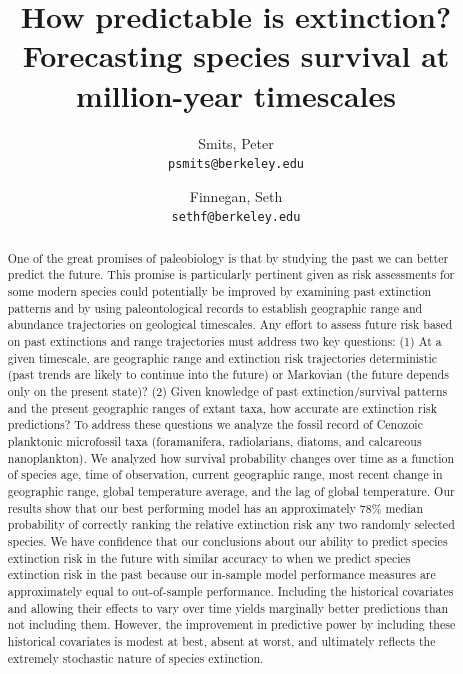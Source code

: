 \documentclass[12pt,letterpaper]{article}
\title{How predictable is extinction? Forecasting species survival at million-year timescales}
\author{
  Smits, Peter\\
  \texttt{psmits@berkeley.edu} 
  \and
  Finnegan, Seth\\
  \texttt{sethf@berkeley.edu}
}
\begin{document}
\maketitle

\linenumbers{}
\modulolinenumbers[3]

\begin{abstract}
  One of the great promises of paleobiology is that by studying the past we can better predict the future. This promise is particularly pertinent given as risk assessments for some modern species could potentially be improved by examining past extinction patterns and by using paleontological records to establish geographic range and abundance trajectories on geological timescales. Any effort to assess future risk based on past extinctions and range trajectories must address two key questions:  (1) At a given timescale, are geographic range and extinction risk trajectories deterministic (past trends are likely to continue into the future) or Markovian (the future depends only on the present state)? (2) Given knowledge of past extinction/survival patterns and the present geographic ranges of extant taxa, how accurate are extinction risk predictions?  
  To address these questions we analyze the fossil record of Cenozoic planktonic microfossil taxa (foramanifera, radiolarians, diatoms, and calcareous nanoplankton). 
  We analyzed how survival probability changes over time as a function of species age, time of observation, current geographic range, most recent change in geographic range, global temperature average, and the lag of global temperature. 
  Our results show that our best performing model has an approximately 78\% median probability of correctly ranking the relative extinction risk any two randomly selected species. 
  We have confidence that our conclusions about our ability to predict species extinction risk in the future with similar accuracy to when we predict species extinction risk in the past because our in-sample model performance measures are approximately equal to out-of-sample performance. 
  Including the historical covariates and allowing their effects to vary over time yields marginally better predictions than not including them. 
  However, the improvement in predictive power by including these historical covariates is modest at best, absent at worst, and ultimately reflects the extremely stochastic nature of species extinction. 

\end{abstract}
\end{document}
